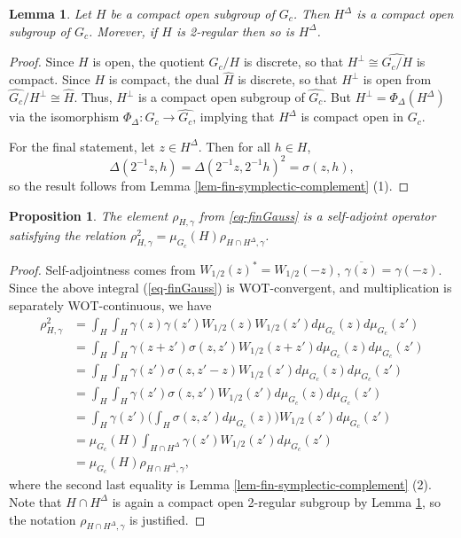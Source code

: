 \documentclass[12pt,reqno]{amsart}
\newtheorem{lem}[thm]{Lemma}
\newtheorem{prop}[thm]{Proposition}
\theoremstyle{definition}
\theoremstyle{definition}
\theoremstyle{definition}
\numberwithin{thm}{section}
\numberwithin{equation}{section}
\newcommand{\wh}[1]{\widehat{#1}}
\begin{document}
  
\begin{lem}\label{lem-compactopen} Let $H$ be a compact open subgroup of $G_c$. Then $H^\Delta$ is a compact open subgroup of $G_c$. Morever, if $H$ is 2-regular then so is $H^\Delta$.
\end{lem}

\begin{proof} Since $H$ is open, the quotient $G_c/H$ is discrete, so that $H^\perp \cong \widehat{G_c/H}$ is compact. Since $H$ is compact, the dual $\wh{H}$ is discrete, so that $H^\perp$ is open from $\widehat{G_c}/H^{\perp}\cong\widehat{H}$. Thus, $H^\perp$ is a compact open subgroup of $\wh{G_c}$. But $H^\perp=\Phi_\Delta(H^\Delta)$ via the isomorphism $\Phi_{\Delta}:G_c\rightarrow\widehat{G_c}$, implying that $H^\Delta$ is compact open in $G_c$.

For the final statement, let $z\in H^\Delta$. Then for all $h\in H$, 
$$\Delta(2^{-1}z,h)=\Delta(2^{-1}z,2^{-1}h)^2=\sigma(z,h),$$
so the result follows from Lemma \ref{lem-fin-symplectic-complement} (1).
\end{proof}


\begin{prop} \label{prop-fin-square}
The element $\rho_{H,\gamma}$ from \eqref{eq-finGauss} is a self-adjoint operator satisfying the relation $\rho_{H,\gamma}^2=\mu_{G_c}(H)\rho_{H\cap H^{\Delta},\gamma}$.
\end{prop}
\begin{proof}
Self-adjointness comes from $W_{1/2}(z)^*=W_{1/2}(-z)$, $\overline{\gamma(z)}=\gamma(-z)$. Since the above integral (\ref{eq-finGauss}) is WOT-convergent, and multiplication is separately WOT-continuous, we have
\begin{align*}
    \rho_{H,\gamma}^2 &=\int_H\int_H\gamma(z)\gamma(z')W_{1/2}(z)W_{1/2}(z')d\mu_{G_c}(z)d\mu_{G_c}(z')\\
    &=\int_H\int_H\gamma(z+z')\sigma(z,z')W_{1/2}(z+z')d\mu_{G_c}(z)d\mu_{G_c}(z')\\
    &=\int_H\int_H\gamma(z')\sigma(z,z'-z)W_{1/2}(z')d\mu_{G_c}(z)d\mu_{G_c}(z')\\
    &=\int_H\int_H\gamma(z')\sigma(z,z')W_{1/2}(z')d\mu_{G_c}(z)d\mu_{G_c}(z')\\
    &=\int_H\gamma(z')\bigg(\int_H\sigma(z,z')d\mu_{G_c}(z)\bigg)W_{1/2}(z')d\mu_{G_c}(z')\\
    &=\mu_{G_c}(H)\int_{H\cap H^{\Delta}}\gamma(z')W_{1/2}(z')d\mu_{G_c}(z')\\
    &=\mu_{G_c}(H)\rho_{H\cap H^{\Delta},\gamma},
\end{align*}
where the second last equality is Lemma \ref{lem-fin-symplectic-complement} (2). Note that $H\cap H^\Delta$ is again a compact open 2-regular subgroup by Lemma \ref{lem-compactopen}, so the notation $\rho_{H\cap H^{\Delta},\gamma}$ is justified.
\end{proof}
\end{document}
